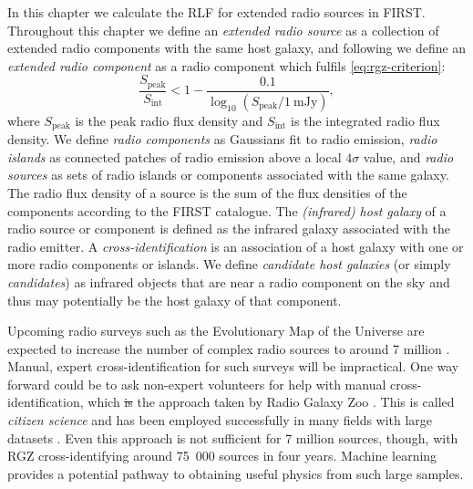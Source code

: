\documentclass[11pt, a4paper]{book}
\newcommand{\defn}[1]{\emph{#1}}
\providecommand{\DIFaddtex}[1]{{\protect\color{blue}\uwave{#1}}} %
\providecommand{\DIFdeltex}[1]{{\protect\color{red}\sout{#1}}}                      %
\providecommand{\DIFaddbegin}{} %
\providecommand{\DIFaddend}{} %
\providecommand{\DIFdelbegin}{} %
\providecommand{\DIFdelend}{} %
\providecommand{\DIFadd}[1]{\texorpdfstring{\DIFaddtex{#1}}{#1}} %
\providecommand{\DIFdel}[1]{\texorpdfstring{\DIFdeltex{#1}}{}} %
\newcommand{\DIFscaledelfig}{0.5}
\newlength{\DIFdelgraphicswidth} %
\newlength{\DIFdelgraphicsheight} %
\newcommand{\DIFaddincludegraphics}[2][]{{\color{blue}\fbox{\DIFOincludegraphics[#1]{#2}}}} %
\newcommand{\DIFdelincludegraphics}[2][]{%
\sbox{\DIFdelgraphicsbox}{\DIFOincludegraphics[#1]{#2}}%
\settoboxwidth{\DIFdelgraphicswidth}{\DIFdelgraphicsbox} %
\settoboxtotalheight{\DIFdelgraphicsheight}{\DIFdelgraphicsbox} %
\scalebox{\DIFscaledelfig}{%
\parbox[b]{\DIFdelgraphicswidth}{\usebox{\DIFdelgraphicsbox}\\[-\baselineskip] \rule{\DIFdelgraphicswidth}{0em}}\llap{\resizebox{\DIFdelgraphicswidth}{\DIFdelgraphicsheight}{%
\setlength{\unitlength}{\DIFdelgraphicswidth}%
\begin{picture}(1,1)%
\thicklines\linethickness{2pt} %
{\color[rgb]{1,0,0}\put(0,0){\framebox(1,1){}}}%
{\color[rgb]{1,0,0}\put(0,0){\line( 1,1){1}}}%
{\color[rgb]{1,0,0}\put(0,1){\line(1,-1){1}}}%
\end{picture}%
}\hspace*{3pt}}} %
} %
\DeclareRobustCommand{\DIFaddbegin}{\DIFOaddbegin \let\includegraphics\DIFaddincludegraphics} %
\DeclareRobustCommand{\DIFaddend}{\DIFOaddend \let\includegraphics\DIFOincludegraphics} %
\DeclareRobustCommand{\DIFdelbegin}{\DIFOdelbegin \let\includegraphics\DIFdelincludegraphics} %
\DeclareRobustCommand{\DIFdelend}{\DIFOaddend \let\includegraphics\DIFOincludegraphics} %
\begin{document}
In this chapter we calculate the RLF for extended radio sources in FIRST. Throughout this chapter we define an \defn{extended radio source} as a collection of extended radio components with the same host galaxy, and following
\citet{banfield15} we define an \defn{extended radio component} as a radio
component which fulfils \autoref{eq:rgz-criterion}:
\begin{equation}
    \frac{S_{\mathrm{peak}}}{S_{\mathrm{int}}} < 1 - \frac{0.1}{\log_{10}(S_{\mathrm{peak}} / 1\ \mathrm{mJy})},
    \label{eq:rgz-criterion}
\end{equation}
where $S_{\mathrm{peak}}$ is the peak radio flux density and
$S_{\mathrm{int}}$ is the integrated radio flux density. We define \defn{radio components} as Gaussians fit to
radio emission, \defn{radio islands} as connected patches of radio emission
above a local $4\sigma$ value, and \defn{radio sources} as sets of radio
islands or components associated with the same galaxy. The radio flux density of a source is the sum of the flux densities of the components according to the FIRST catalogue. The \defn{(infrared)
host galaxy} of a radio source or component is defined as the infrared galaxy
associated with the radio emitter. A \defn{cross-identification} is an
association of a host galaxy with one or more radio components or islands. We
define \defn{candidate host galaxies} (or simply
\defn{candidates}) as infrared objects that are near a radio component on
the sky and thus may potentially be the host galaxy of that component.

Upcoming
radio surveys such as the Evolutionary Map of the Universe
\citep[EMU;][]{norris11} are expected to increase the number
of complex radio sources to around 7 million \citep{banfield15}. Manual, expert cross-identification for such surveys will be impractical. One way forward could be to ask non-expert volunteers for help with manual cross-identification, which \DIFdelbegin \DIFdel{is }\DIFdelend \DIFaddbegin \DIFadd{was }\DIFaddend the approach taken by Radio Galaxy Zoo \citep[RGZ;][]{banfield15}. This is called \defn{citizen science} and has been employed successfully in many fields with large datasets \citep{marshall15citizen}. Even this approach is not sufficient for 7 million sources, though, with RGZ cross-identifying around 75~000 sources in four years. Machine
learning provides a potential pathway to obtaining useful physics from such
large samples.
\end{document}
